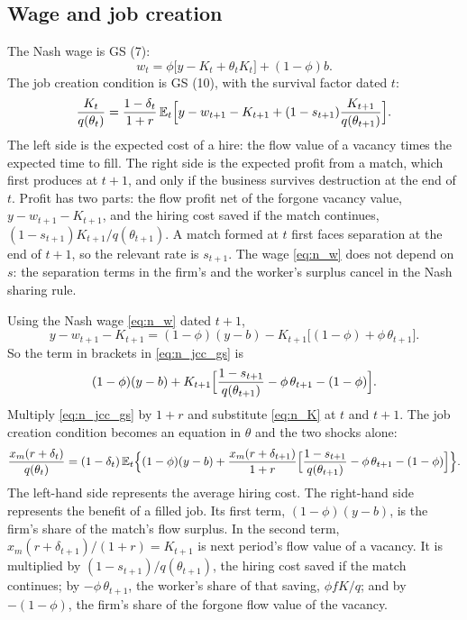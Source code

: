 \documentclass[authoryear, review, 12pt]{elsarticle}
\begin{document}
\subsection{Wage and job creation}

The Nash wage is GS (7):
\begin{equation}\label{eq:n_w}
	w_t=\phi\bigl[y-K_t+\theta_tK_t\bigr]+(1-\phi)b .
\end{equation}
The job creation condition is GS (10), with the survival factor dated $t$:
\begin{equation}\label{eq:n_jcc_gs}
	\frac{K_t}{q(\theta_t)}
	=\frac{1-\delta_t}{1+r}\,\mathbb{E}_t\Bigl[y-w_{t+1}-K_{t+1}+(1-s_{t+1})\frac{K_{t+1}}{q(\theta_{t+1})}\Bigr].
\end{equation}
The left side is the expected cost of a hire: the flow value of a vacancy times the
expected time to fill. The right side is the expected profit from a match, which first
produces at $t+1$, and only if the business survives destruction at the end of $t$. Profit
has two parts: the flow profit net of the forgone vacancy value, $y-w_{t+1}-K_{t+1}$, and
the hiring cost saved if the match continues, $(1-s_{t+1})K_{t+1}/q(\theta_{t+1})$. A match
formed at $t$ first faces separation at the end of $t+1$, so the relevant rate is
$s_{t+1}$. The wage \eqref{eq:n_w} does not depend on $s$: the separation terms in the
firm's and the worker's surplus cancel in the Nash sharing rule.

Using the Nash wage \eqref{eq:n_w} dated $t+1$,
\[
	y-w_{t+1}-K_{t+1}=(1-\phi)(y-b)-K_{t+1}\bigl[(1-\phi)+\phi\,\theta_{t+1}\bigr].
\]
So the term in brackets in \eqref{eq:n_jcc_gs} is
\[
	(1-\phi)(y-b)+K_{t+1}\Bigl[\frac{1-s_{t+1}}{q(\theta_{t+1})}-\phi\,\theta_{t+1}-(1-\phi)\Bigr].
\]
Multiply \eqref{eq:n_jcc_gs} by $1+r$ and substitute \eqref{eq:n_K} at $t$ and $t+1$. The
job creation condition becomes an equation in $\theta$ and the two shocks alone:
\begin{equation}\label{eq:n_jcc}
	\frac{x_m(r+\delta_t)}{q(\theta_t)}
	=(1-\delta_t)\,\mathbb{E}_t\Bigl\{(1-\phi)(y-b)
	+\frac{x_m(r+\delta_{t+1})}{1+r}\Bigl[\frac{1-s_{t+1}}{q(\theta_{t+1})}-\phi\,\theta_{t+1}-(1-\phi)\Bigr]\Bigr\}.
\end{equation}
The left-hand side represents the average hiring cost. The right-hand side represents the
benefit of a filled job. Its first term, $(1-\phi)(y-b)$, is the firm's share of the match's
flow surplus. In the second term, $x_m(r+\delta_{t+1})/(1+r)=K_{t+1}$ is next period's flow
value of a vacancy. It is multiplied by $(1-s_{t+1})/q(\theta_{t+1})$, the hiring cost saved if
the match continues; by $-\phi\,\theta_{t+1}$, the worker's share of that saving,
$\phi fK/q$; and by $-(1-\phi)$, the firm's share of the forgone flow value of the vacancy.
\end{document}
